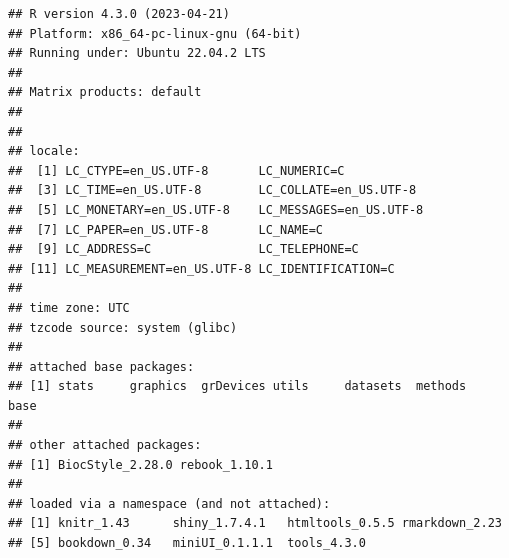 \documentclass[
]{book}
\begin{document}
\begin{verbatim}
## R version 4.3.0 (2023-04-21)
## Platform: x86_64-pc-linux-gnu (64-bit)
## Running under: Ubuntu 22.04.2 LTS
## 
## Matrix products: default
## 
## 
## locale:
##  [1] LC_CTYPE=en_US.UTF-8       LC_NUMERIC=C              
##  [3] LC_TIME=en_US.UTF-8        LC_COLLATE=en_US.UTF-8    
##  [5] LC_MONETARY=en_US.UTF-8    LC_MESSAGES=en_US.UTF-8   
##  [7] LC_PAPER=en_US.UTF-8       LC_NAME=C                 
##  [9] LC_ADDRESS=C               LC_TELEPHONE=C            
## [11] LC_MEASUREMENT=en_US.UTF-8 LC_IDENTIFICATION=C       
## 
## time zone: UTC
## tzcode source: system (glibc)
## 
## attached base packages:
## [1] stats     graphics  grDevices utils     datasets  methods   base     
## 
## other attached packages:
## [1] BiocStyle_2.28.0 rebook_1.10.1   
## 
## loaded via a namespace (and not attached):
## [1] knitr_1.43      shiny_1.7.4.1   htmltools_0.5.5 rmarkdown_2.23 
## [5] bookdown_0.34   miniUI_0.1.1.1  tools_4.3.0
\end{verbatim}

  
\end{document}
